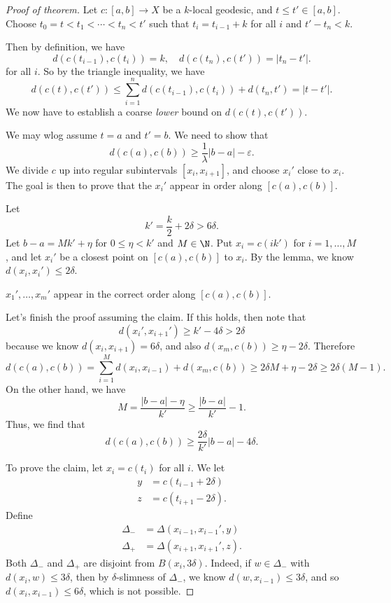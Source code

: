 \documentclass[a4paper]{article}
\begin{document}
\begin{proof}[Proof of theorem]
  Let $c: [a, b] \to X$ be a $k$-local geodesic, and $t \leq t' \in [a, b]$. Choose $t_0 = t < t_1 < \cdots < t_n < t'$ such that $t_i = t_{i - 1} + k$ for all $i$ and $t' - t_n < k$.

  Then by definition, we have
  \[
    d(c(t_{i - 1}), c(t_i)) = k,\quad d(c(t_n), c(t')) = |t_n - t'|.
  \]
  for all $i$. So by the triangle inequality, we have
  \[
    d(c(t), c(t')) \leq \sum_{i = 1}^n d(c(t_{i - 1}), c(t_i)) + d(t_n, t') = |t - t'|.
  \]
  We now have to establish a coarse \emph{lower} bound on $d(c(t), c(t'))$.

  We may wlog assume $t = a$ and $t' = b$. We need to show that
  \[
    d(c(a), c(b)) \geq \frac{1}{\lambda} |b - a| - \varepsilon.
  \]
  We divide $c$ up into regular subintervals $[x_i, x_{i + 1}]$, and choose $x_i'$ close to $x_i$. The goal is then to prove that the $x_i'$ appear in order along $[c(a), c(b)]$.

  Let
  \[
    k' = \frac{k}{2} + 2 \delta > 6\delta.
  \]
  Let $b - a = M k' + \eta$ for $0 \leq \eta < k'$ and $M \in \N$. Put $x_i = c(i k')$ for $i = 1, \ldots, M$, and let $x_i'$ be a closest point on $[c(a), c(b)]$ to $x_i$. By the lemma, we know $d(x_i, x_i') \leq 2\delta$.

  \begin{claim}
    $x_1', \ldots, x_m'$ appear in the correct order along $[c(a), c(b)]$.
  \end{claim}
  Let's finish the proof assuming the claim. If this holds, then note that
  \[
    d(x_i', x_{i + 1}') \geq k' - 4\delta > 2\delta
  \]
  because we know $d(x_i, x_{i + 1}) = 6\delta$, and also $d(x_m, c(b)) \geq \eta - 2 \delta$. Therefore
  \[
    d(c(a), c(b)) = \sum_{i = 1}^M d(x_i, x_{i - 1}) + d(x_m, c(b)) \geq 2 \delta M + \eta - 2 \delta \geq 2\delta(M - 1).
  \]
  On the other hand, we have
  \[
    M = \frac{|b - a| - \eta}{k'} \geq \frac{|b - a|}{k'} - 1.
  \]
  Thus, we find that
  \[
    d(c(a), c(b)) \geq \frac{2\delta}{k'} |b - a| - 4 \delta.
  \]

  To prove the claim, let $x_i = c(t_i)$ for all $i$. We let
  \begin{align*}
    y &= c(t_{i - 1} + 2 \delta)\\
    z &= c(t_{i + 1} - 2 \delta).
  \end{align*}
  Define
  \begin{align*}
    \Delta_- &= \Delta(x_{i - 1}, x_{i - 1}', y)\\
    \Delta_+ &= \Delta(x_{i + 1}, x_{i + 1}', z).
  \end{align*}
  Both $\Delta_-$ and $\Delta_+$ are disjoint from $B(x_i, 3 \delta)$. Indeed, if $w \in \Delta_-$ with $d(x_i, w) \leq 3\delta$, then by $\delta$-slimness of $\Delta_-$, we know $d(w, x_{i - 1}) \leq 3 \delta$, and so $d(x_i, x_{i - 1}) \leq 6 \delta$, which is not possible.


\end{proof}
\end{document}
